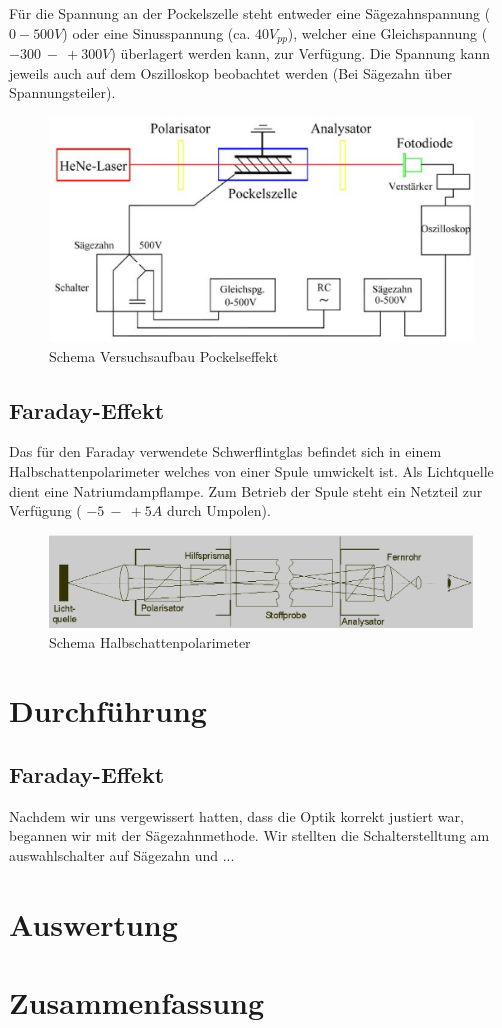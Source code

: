 \documentclass[12pt]{article}
\begin{document}
Für die Spannung an der Pockelszelle steht entweder eine Sägezahnspannung ($0 - 500V$) oder eine Sinusspannung (ca. $40V_{pp}$), welcher eine Gleichspannung ($-300~-~+300V$) überlagert werden kann, zur Verfügung. Die Spannung kann jeweils auch auf dem Oszilloskop beobachtet werden (Bei Sägezahn über Spannungsteiler).

\begin{figure}[H]
\centering
\includegraphics[width=0.9\linewidth]{pictures/aufbau-pockels.eps}
\caption{Schema Versuchsaufbau Pockelseffekt}
\end{figure}

\subsection{Faraday-Effekt}

Das für den Faraday verwendete Schwerflintglas befindet sich in einem Halbschattenpolarimeter welches von einer Spule umwickelt ist. Als Lichtquelle dient eine Natriumdampflampe. Zum Betrieb der Spule steht ein Netzteil zur Verfügung ( $-5~-~+5A$ durch Umpolen).

\begin{figure}[H]
\centering
\includegraphics[width=1\linewidth]{pictures/halbschattenpolarimeter.eps}
\caption{Schema Halbschattenpolarimeter}
\end{figure}


\section{Durchführung}
\subsection{Faraday-Effekt}
Nachdem wir uns vergewissert hatten, dass die Optik korrekt justiert war, begannen wir mit der Sägezahnmethode.
Wir stellten die Schalterstelltung am auswahlschalter auf Sägezahn und ...
\section{Auswertung}

\section{Zusammenfassung}
\end{document}
